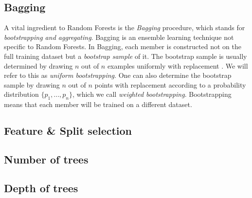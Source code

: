 \documentclass[../main.tex]{subfiles}
\begin{document}



\subsection{Bagging}
\label{sec:bagging}

A vital ingredient to Random Forests is the \textit{Bagging} procedure, which stands for \textit{bootstrapping and aggregating}. Bagging is an ensemble learning technique not specific to Random Forests. In Bagging, each member is constructed not on the full training dataset but a \textit{bootstrap sample} of it. The bootstrap sample is usually determined by drawing $n$ out of $n$ examples uniformly with replacement \cite{breiman,others}. We will refer to this as \textit{uniform bootstrapping}. One can also determine the bootstrap sample by drawing $n$ out of $n$ points with replacement according to a probability distribution $\{p_1, ..., p_n\}$, which we call \textit{weighted bootstrapping}. Bootstrapping means that each member will be trained on a different dataset. 



\subsection{Feature \& Split selection}


\subsection{Number of trees}

\subsection{Depth of trees}
\end{document}

